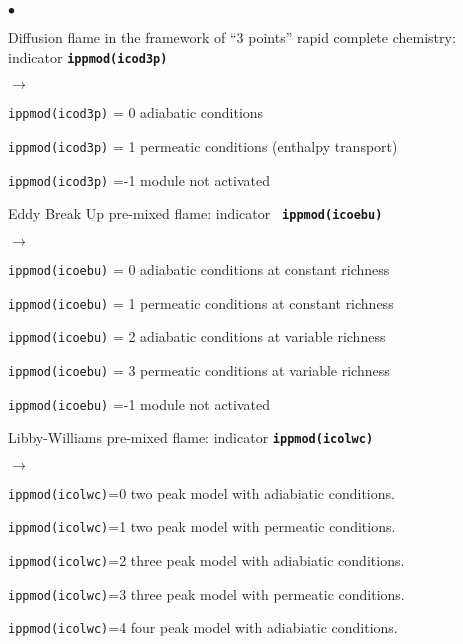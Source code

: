 {{\begin{list}{$\bullet$}{}
       \item Diffusion flame in the framework of ``3 points'' rapid complete
             chemistry: indicator {\bf \tt ippmod(icod3p)}
        \begin{list}{$\rightarrow$}{}
               \item \texttt{ippmod(icod3p)} = 0 adiabatic conditions
               \item \texttt{ippmod(icod3p)} = 1 permeatic conditions (enthalpy
                     transport)
               \item \texttt{ippmod(icod3p)} =-1 module not activated
         \end{list}
        \item Eddy Break Up pre-mixed flame: indicator {\bf \tt
             ippmod(icoebu)}
         \begin{list}{$\rightarrow$}{}
                \item \texttt{ippmod(icoebu)} = 0 adiabatic
                      conditions at constant richness
                \item \texttt{ippmod(icoebu)} = 1 permeatic conditions at
                      constant richness
                \item \texttt{ippmod(icoebu)} = 2 adiabatic conditions at
                      variable richness
                \item \texttt{ippmod(icoebu)} = 3 permeatic conditions at
                      variable richness
                \item \texttt{ippmod(icoebu)} =-1 module not activated
         \end{list}
        \item Libby-Williams pre-mixed flame: indicator {\bf \tt ippmod(icolwc)}
         \begin{list}{$\rightarrow$}{}
               \item \texttt{ippmod(icolwc)}=0 two peak model with adiabiatic conditions.
               \item \texttt{ippmod(icolwc)}=1 two peak model with permeatic conditions.
               \item \texttt{ippmod(icolwc)}=2 three peak model with adiabiatic conditions.
               \item \texttt{ippmod(icolwc)}=3 three peak model with permeatic conditions.
               \item \texttt{ippmod(icolwc)}=4 four peak model with adiabiatic conditions.

\end{list}
\end{list}}}
